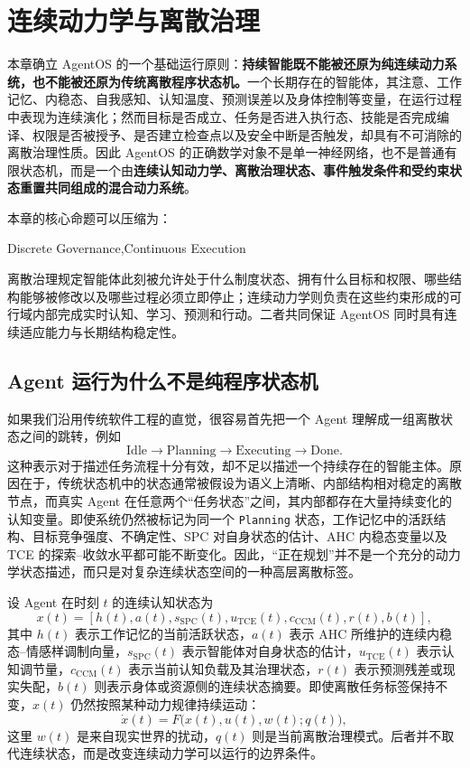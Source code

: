 \chapter{连续动力学与离散治理}
\label{chap:continuous-discrete-governance}

\begin{chapterlead}
本章确立 AgentOS 的一个基础运行原则：\textbf{持续智能既不能被还原为纯连续动力系统，也不能被还原为传统离散程序状态机。}一个长期存在的智能体，其注意、工作记忆、内稳态、自我感知、认知温度、预测误差以及身体控制等变量，在运行过程中表现为连续演化；然而目标是否成立、任务是否进入执行态、技能是否完成编译、权限是否被授予、是否建立检查点以及安全中断是否触发，却具有不可消除的离散治理性质。因此 AgentOS 的正确数学对象不是单一神经网络，也不是普通有限状态机，而是一个由\textbf{连续认知动力学、离散治理状态、事件触发条件和受约束状态重置共同组成的混合动力系统}。

本章的核心命题可以压缩为：
\begin{statementbox}
Discrete Governance,\qquad Continuous Execution
\end{statementbox}
离散治理规定智能体此刻被允许处于什么制度状态、拥有什么目标和权限、哪些结构能够被修改以及哪些过程必须立即停止；连续动力学则负责在这些约束形成的可行域内部完成实时认知、学习、预测和行动。二者共同保证 AgentOS 同时具有连续适应能力与长期结构稳定性。
\end{chapterlead}

\section{Agent 运行为什么不是纯程序状态机}

如果我们沿用传统软件工程的直觉，很容易首先把一个 Agent 理解成一组离散状态之间的跳转，例如
\[
\mathrm{Idle}
\rightarrow
\mathrm{Planning}
\rightarrow
\mathrm{Executing}
\rightarrow
\mathrm{Done}.
\]
这种表示对于描述任务流程十分有效，却不足以描述一个持续存在的智能主体。原因在于，传统状态机中的状态通常被假设为语义上清晰、内部结构相对稳定的离散节点，而真实 Agent 在任意两个“任务状态”之间，其内部都存在大量持续变化的认知变量。即使系统仍然被标记为同一个 \texttt{Planning} 状态，工作记忆中的活跃结构、目标竞争强度、不确定性、SPC 对自身状态的估计、AHC 内稳态变量以及 TCE 的探索--收敛水平都可能不断变化。因此，“正在规划”并不是一个充分的动力学状态描述，而只是对复杂连续状态空间的一种高层离散标签。

设 Agent 在时刻 \(t\) 的连续认知状态为
\[
x(t)
=
\left[
h(t),
a(t),
s_{\mathrm{SPC}}(t),
u_{\mathrm{TCE}}(t),
c_{\mathrm{CCM}}(t),
r(t),
b(t)
\right],
\]
其中 \(h(t)\) 表示工作记忆的当前活跃状态，\(a(t)\) 表示 AHC 所维护的连续内稳态--情感样调制向量，\(s_{\mathrm{SPC}}(t)\) 表示智能体对自身状态的估计，\(u_{\mathrm{TCE}}(t)\) 表示认知调节量，\(c_{\mathrm{CCM}}(t)\) 表示当前认知负载及其治理状态，\(r(t)\) 表示预测残差或现实失配，\(b(t)\) 则表示身体或资源侧的连续状态摘要。即使离散任务标签保持不变，\(x(t)\) 仍然按照某种动力规律持续运动：
\[
\dot{x}(t)
=
F\bigl(
x(t),
u(t),
w(t);
q(t)
\bigr),
\]
这里 \(w(t)\) 是来自现实世界的扰动，\(q(t)\) 则是当前离散治理模式。后者并不取代连续状态，而是改变连续动力学可以运行的边界条件。

